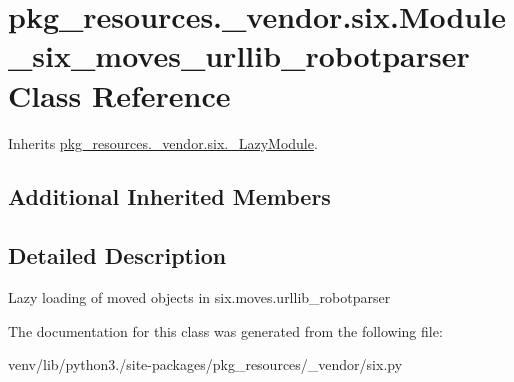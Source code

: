 \hypertarget{classpkg__resources_1_1__vendor_1_1six_1_1_module__six__moves__urllib__robotparser}{}\section{pkg\+\_\+resources.\+\_\+vendor.\+six.\+Module\+\_\+six\+\_\+moves\+\_\+urllib\+\_\+robotparser Class Reference}
\label{classpkg__resources_1_1__vendor_1_1six_1_1_module__six__moves__urllib__robotparser}


Inherits \hyperlink{classpkg__resources_1_1__vendor_1_1six_1_1___lazy_module}{pkg\+\_\+resources.\+\_\+vendor.\+six.\+\_\+\+Lazy\+Module}.

\subsection*{Additional Inherited Members}


\subsection{Detailed Description}
\begin{DoxyVerb}Lazy loading of moved objects in six.moves.urllib_robotparser\end{DoxyVerb}
 

The documentation for this class was generated from the following file\+:\begin{DoxyCompactItemize}
\item 
venv/lib/python3./site-\/packages/pkg\+\_\+resources/\+\_\+vendor/six.\+py\end{DoxyCompactItemize}
